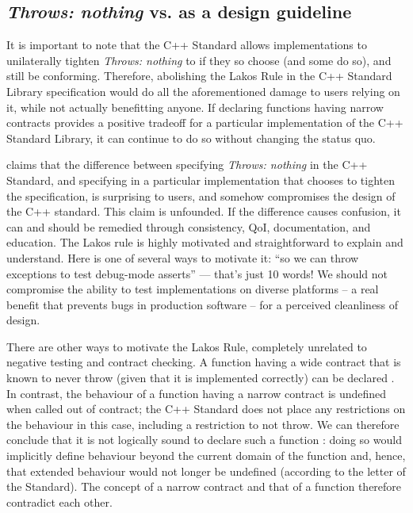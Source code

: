 \subsection{\emph{Throws: nothing} vs.  as a design guideline}

It is important to note that the C++ Standard allows implementations to unilaterally tighten \emph{Throws: nothing} to  if they so choose (and some do so), and still be conforming. Therefore, abolishing the Lakos Rule in the C++ Standard Library specification would do all the aforementioned damage to users relying on it, while not actually benefitting anyone. If declaring functions having narrow contracts  provides a positive tradeoff for a particular implementation of the C++ Standard Library, it can continue to do so without changing the status quo.

\cite{P1656R2} claims that the difference between specifying \emph{Throws: nothing} in the C++ Standard, and specifying  in a particular implementation that chooses to tighten the specification, is surprising to users, and somehow compromises the design of the C++ standard. This claim is unfounded. If the difference causes confusion, it can and should be remedied through consistency, QoI, documentation, and education. The Lakos rule is highly motivated and straightforward to explain and understand. Here is one of several ways to motivate it: ``so we can throw exceptions to test debug-mode asserts'' --- that's just 10 words! We should not compromise the ability to test implementations on diverse platforms -- a real benefit that prevents bugs in production software -- for a perceived cleanliness of design.

There are other ways to motivate the Lakos Rule, completely unrelated to negative testing and contract checking. A function having a wide contract that is known to never throw (given that it is implemented correctly) can be declared . In contrast, the behaviour of a function having a narrow contract is undefined when called out of contract; the C++ Standard does not place any restrictions on the behaviour in this case, including a restriction to not throw. We can therefore conclude that it is not logically sound to declare such a function : doing so would implicitly define behaviour beyond the current domain of the function and, hence, that extended behaviour would not longer be undefined (according to the letter of the Standard). The concept of a narrow contract and that of a  function therefore contradict each other.

